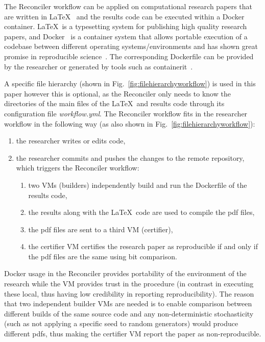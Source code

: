 \documentclass[journal]{IEEEtran}
\begin{document}
The Reconciler workflow can be applied on computational research papers that are written in \LaTeX~\cite{lamport1994latex} and the results code can be executed within a Docker container.
\LaTeX\ is a typesetting system for publishing high quality research papers, and Docker~\cite{merkel2014docker} is a container system that allows portable execution of a codebase between different operating systems/environments and has shown great promise in reproducible science~\cite{boettiger2015introduction}.
The corresponding Dockerfile can be provided by the researcher or generated by tools such as containerit~\cite{nust2019containerit}.

A specific file hierarchy (shown in Fig.~\ref{fig:filehierarchyworkflow}) is used in this paper however this is optional, as the Reconciler only needs to know the directories of the main files of the \LaTeX\ and results code through its configuration file \textit{workflow.yml}.
The Reconciler workflow fits in the researcher workflow in the following way (as also shown in Fig.~\ref{fig:filehierarchyworkflow}):
\begin{enumerate}
	\item the researcher writes or edits code,
	\item the researcher commits and pushes the changes to the remote repository, which triggers the Reconciler workflow:
		\begin{enumerate}
			\item two VMs (builders) independently build and run the Dockerfile of the results code,
			\item the results along with the \LaTeX\ code are used to compile the pdf files,
			\item the pdf files are sent to a third VM (certifier),
			\item the certifier VM certifies the research paper as reproducible if and only if the pdf files are the same using bit comparison.
		\end{enumerate}
\end{enumerate}

Docker usage in the Reconciler provides portability of the environment of the research while the VM provides trust in the procedure (in contrast in executing these local, thus having low credibility in reporting reproducibility).
The reason that two independent builder VMs are needed is to enable comparison between different builds of the same source code and any non-deterministic stochasticity (such as not applying a specific seed to random generators) would produce different pdfs, thus making the certifier VM report the paper as non-reproducible.
\end{document}
